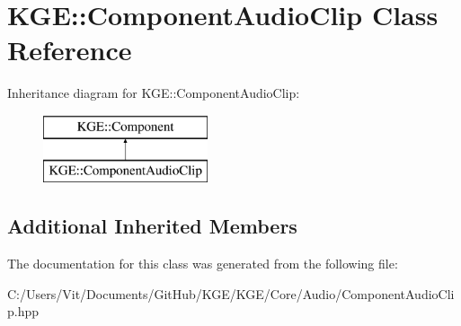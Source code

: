 \hypertarget{class_k_g_e_1_1_component_audio_clip}{\section{K\-G\-E\-:\-:Component\-Audio\-Clip Class Reference}
\label{class_k_g_e_1_1_component_audio_clip}
}
Inheritance diagram for K\-G\-E\-:\-:Component\-Audio\-Clip\-:\begin{figure}[H]
\begin{center}
\leavevmode
\includegraphics[height=2.000000cm]{class_k_g_e_1_1_component_audio_clip}
\end{center}
\end{figure}
\subsection*{Additional Inherited Members}


The documentation for this class was generated from the following file\-:\begin{DoxyCompactItemize}
\item 
C\-:/\-Users/\-Vit/\-Documents/\-Git\-Hub/\-K\-G\-E/\-K\-G\-E/\-Core/\-Audio/Component\-Audio\-Clip.\-hpp\end{DoxyCompactItemize}
